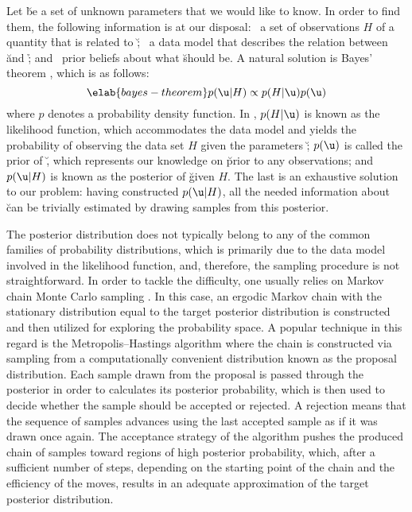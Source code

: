 Let \u be a set of unknown parameters that we would like to know. In order to
find them, the following information is at our disposal: \one~a set of
observations $H$ of a quantity \h that is related to \u; \two~a data model that
describes the relation between \u and \h; and \three~prior beliefs about what \u
should be. A natural solution is Bayes' theorem \cite{gelman2004}, which is as
follows:
\begin{equation} \elab{bayes-theorem}
  p(\u | H) \propto p(H | \u) p(\u)
\end{equation}
where $p$ denotes a probability density function. In , $p(H
| \u)$ is known as the likelihood function, which accommodates the data model
and yields the probability of observing the data set $H$ given the parameters
\u; $p(\u)$ is called the prior of \u, which represents our knowledge on \u
prior to any observations; and $p(\u | H)$ is known as the posterior of \u given
$H$. The last is an exhaustive solution to our problem: having constructed $p(\u
| H)$, all the needed information about \u can be trivially estimated by drawing
samples from this posterior.

The posterior distribution does not typically belong to any of the common
families of probability distributions, which is primarily due to the data model
involved in the likelihood function, and, therefore, the sampling procedure is
not straightforward. In order to tackle the difficulty, one usually relies on
Markov chain Monte Carlo sampling \cite{gelman2004}. In this case, an ergodic
Markov chain with the stationary distribution equal to the target posterior
distribution is constructed and then utilized for exploring the probability
space. A popular technique in this regard is the Metropolis--Hastings algorithm
where the chain is constructed via sampling from a computationally convenient
distribution known as the proposal distribution. Each sample drawn from the
proposal is passed through the posterior in order to calculates its posterior
probability, which is then used to decide whether the sample should be accepted
or rejected. A rejection means that the sequence of samples advances using the
last accepted sample as if it was drawn once again. The acceptance strategy of
the algorithm pushes the produced chain of samples toward regions of high
posterior probability, which, after a sufficient number of steps, depending on
the starting point of the chain and the efficiency of the moves, results in an
adequate approximation of the target posterior distribution.
